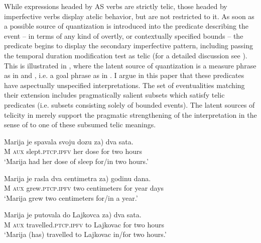 \documentclass[output=paper]{langscibook}
\begin{document}
\noindent While expressions headed by AS verbs are strictly telic, those headed by imperfective verbs display atelic behavior, but are not restricted to it. As soon as a possible source of quantization is introduced into the predicate describing the event -- in terms of any kind of overtly, or contextually specified bounds -- the predicate begins to display the secondary imperfective pattern, including passing the temporal duration modification test as telic (for a detailed discussion see \citealt{chapters/10-Milosavljevic, Milosav.dis}). This is illustrated in , where the latent source of quantization is a measure phrase as in  and , i.e. a goal phrase as in . I argue in this paper that these predicates have aspectually unspecified interpretations. The set of eventualities matching their extension includes pragmatically salient subsets which satisfy telic predicates (i.e. subsets consisting solely of bounded events). The latent sources of telicity in  merely support the pragmatic strengthening of the interpretation in the sense of \citet{Horn.1989} to one of these subsumed telic meanings.\largerpage


\ea\label{ars:ex:boundimp}
		\begin{xlist}
	
	    \ex  \gll Marija je spavala svoju dozu \minsp{(} za) dva sata.\\ 
        M \textsc{aux} slept\textsc{.ptcp.ipfv} her dose {} for two hours \\ 
        \glt `Marija had her dose of sleep for\slash in two hours.'\label{ars:ex:boundimpa}
	    
	    \ex  \gll Marija je rasla dva centimetra \minsp{(} za) godinu dana.\\ 
        M \textsc{aux} grew\textsc{.ptcp.ipfv} two centimeters {} for year days  \\ 
        \glt `Marija grew two centimeters for\slash in a year.'\label{ars:ex:boundimpb}

	    \ex  \gll Marija je putovala do Lajkovca \minsp{(} za) dva sata.\\ 
        M \textsc{aux} travelled\textsc{.ptcp.ipfv} to Lajkovac {} for two hours  \\ 
        \glt `Marija (has) travelled to Lajkovac in/for two hours.'\label{ars:ex:boundimpc}

       	\end{xlist}
\z
\end{document}
